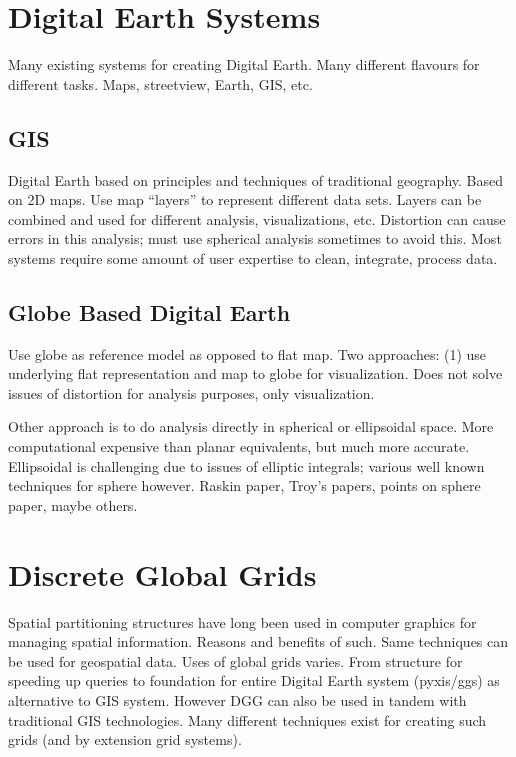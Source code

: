 \section{Digital Earth Systems}
Many existing systems for creating Digital Earth.
Many different flavours for different tasks.
Maps, streetview, Earth, GIS, etc.
\cite{mahdavi2015survey}
\cite{alderson2020digital}


\subsection{GIS}
Digital Earth based on principles and techniques of traditional geography.
Based on 2D maps.
Use map ``layers'' to represent different data sets.
Layers can be combined and used for different analysis, visualizations, etc.
Distortion can cause errors in this analysis; must use spherical analysis sometimes to avoid this.
Most systems require some amount of user expertise to clean, integrate, process data.
\cite{antenucci1991geographic}
\cite{foresman1998history}


\subsection{Globe Based Digital Earth}
Use globe as reference model as opposed to flat map.
Two approaches:
(1) use underlying flat representation and map to globe for visualization.
Does not solve issues of distortion for analysis purposes, only visualization.
\cite{goodchild2018reimagining}


Other approach is to do analysis directly in spherical or ellipsoidal space.
More computational expensive than planar equivalents, but much more accurate.
Ellipsoidal is challenging due to issues of elliptic integrals; various well known techniques for sphere however.
Raskin paper, Troy's papers, points on sphere paper, maybe others.
\cite{raskin1994spatial}
\cite{bahrdt2017rational}
\cite{alderson2016multiresolution}
\cite{alderson2019multiscale}
\cite{alderson2018offsetting}


\section{Discrete Global Grids}
Spatial partitioning structures have long been used in computer graphics for managing spatial information.
Reasons and benefits of such.
Same techniques can be used for geospatial data.
Uses of global grids varies.
From structure for speeding up queries to foundation for entire Digital Earth system (pyxis/ggs) as alternative to GIS system.
However DGG can also be used in tandem with traditional GIS technologies.
Many different techniques exist for creating such grids (and by extension grid systems).
\cite{sahr1998discrete}
\cite{sahr2003geodesic}


